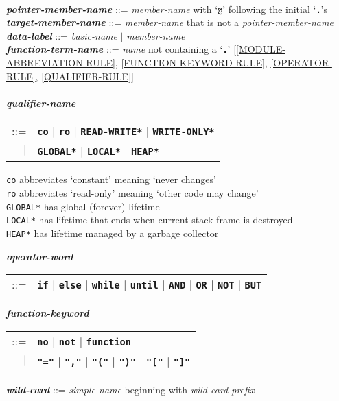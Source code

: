 \documentclass[12pt]{article}
\newcommand{\TT}[1]{{\tt \bfseries #1}}
\newcommand{\ttkey}[1]{{\tt \bfseries #1}}
\newcommand{\emkey}[1]{{\em \bfseries #1}}
\newcommand{\ttakey}[1]{{\tt \bfseries *#1*}}
\newenvironment{indpar}[1][0.3in]%
	{\begin{list}{}%
		     {\setlength{\itemsep}{0in}%
		      \setlength{\topsep}{0in}%
		      \setlength{\parsep}{1ex}%
		      \setlength{\labelwidth}{#1}%
		      \setlength{\leftmargin}{#1}%
		      \addtolength{\leftmargin}{\labelsep}}%
	 \item}%
	{\end{list}}
\begin{document}
\begin{indpar}
\begin{tabular}[t]{@{}l@{}}
			\end{tabular} \\
\emkey{pointer-member-name}\label{POINTER-MEMBER-NAME} ::=
    {\em member-name} with `\TT{@}' following the initial `\TT{.}'s \\
\emkey{target-member-name}\label{TARGET-MEMBER-NAME} ::=
    {\em member-name} that is \underline{not} a {\em pointer-member-name}
\\[1ex]
\emkey{data-label}\label{DATA-LABEL} ::=
    {\em basic-name} $|$ {\em member-name}
\\[1ex]
\emkey{function-term-name} ::= {\em name} not containing a `\TT{.}'
    \label{FUNCTION-TERM-NAME}
	[\ref{MODULE-ABBREVIATION-RULE},
	 \ref{FUNCTION-KEYWORD-RULE},
	 \ref{OPERATOR-RULE},
	 \ref{QUALIFIER-RULE}] \\
\\[1ex]
\emkey{qualifier-name}\label{QUALIFIER-NAME}
    \begin{tabular}[t]{rl}
    ::= & \ttkey{co} $|$ \ttkey{ro} $|$ \ttakey{READ-WRITE}
                     $|$ \ttakey{WRITE-ONLY} \\
    $|$ & \ttakey{GLOBAL} $|$ \ttakey{LOCAL} $|$ \ttakey{HEAP} \\
    \end{tabular}
\begin{indpar}
{\tt co} abbreviates `constant' meaning `never changes' \\
{\tt ro} abbreviates `read-only' meaning `other code may change' \\
{\tt *GLOBAL*} has global (forever) lifetime \\
{\tt *LOCAL*} has lifetime that ends when current stack frame is destroyed \\
{\tt *HEAP*} has lifetime managed by a garbage collector
\end{indpar}
\emkey{operator-word}
    \begin{tabular}[t]{rl}
    ::= & \TT{if} $|$ \TT{else} $|$ \TT{while} $|$ \TT{until}
                  $|$ \TT{AND} $|$ \TT{OR}
		  $|$ \TT{NOT} $|$ \TT{BUT}
    \end{tabular}

\emkey{function-keyword}
    \begin{tabular}[t]{rl}
    ::= & \TT{no} $|$ \TT{not} $|$ \TT{function} \\
    $|$ & \TT{"="} $|$ \TT{","} $|$ \TT{"("} $|$ \TT{")"} $|$
          \TT{"["} $|$ \TT{"]"}
    \end{tabular}

\emkey{wild-card}\label{WILD-CARD}
    ::= {\em simple-name} beginning with {\em wild-card-prefix}


\end{indpar}
\end{document}
